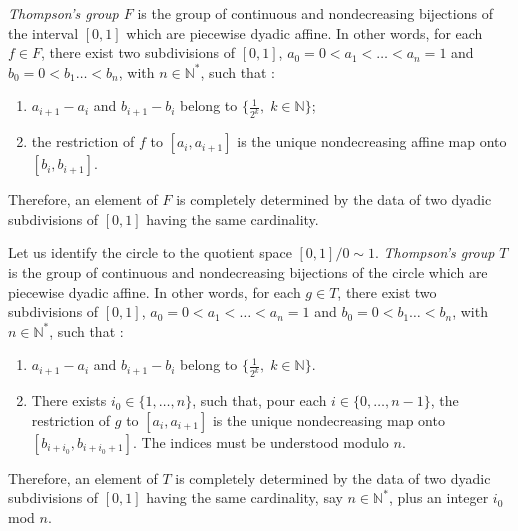 \documentclass[twoside]{irmaems}
\theoremstyle{plain}
\theoremstyle{definition}
\theoremstyle{remark}
\newcommand{\N}{{\mathbb{N}}}
\begin{document}
{\it Thompson's group  $F$}  
is the group of continuous and nondecreasing bijections of the interval $[0,1]$ which are piecewise dyadic affine. In other words, for each $f\in F$, there exist two subdivisions of $[0,1]$, $a_0=0<a_1<\ldots<a_n=1$ and $b_0=0<b_1\ldots<b_n$, with $n\in \N^*$, such that :
\begin{enumerate}
\item $a_{i+1}-a_i$ and $b_{i+1}-b_i$ belong to $\{\frac{1}{2^k},\; k\in \N\}$;
\item  the restriction of $f$ to $[a_i,a_{i+1}]$ is the unique nondecreasing affine map  onto  $[b_i, b_{i+1}]$.
\end{enumerate}

\vspace{0.1cm}\noindent 
Therefore, an element of $F$ is completely determined by the data of two dyadic subdivisions of  $[0,1]$ having the same cardinality.

\vspace{0.1cm}\noindent 
Let us identify the circle to the quotient space $[0,1]/0\sim 1$. {\it Thompson's group $T$}   is the group of continuous and nondecreasing bijections of the circle which are piecewise dyadic affine.
In other words, for each $g\in T$, there exist two  subdivisions of $[0,1]$, $a_0=0<a_1<\ldots<a_n=1$ and $b_0=0<b_1\ldots<b_n$, with  $n\in \N^*$, such that :
\begin{enumerate}
\item $a_{i+1}-a_i$ and $b_{i+1}-b_i$ belong to $\{\frac{1}{2^k},\; k\in \N\}$.  
\item There exists $i_0\in \{1,\ldots, n\}$, such that, pour each $i\in \{0,\ldots, n-1\}$, the restriction of $g$ to $[a_i,a_{i+1}]$ is the unique nondecreasing map onto $[b_{i+i_0}, b_{i+i_0+1}]$. The indices must be understood  modulo $n$.
\end{enumerate}

\vspace{0.1cm}\noindent 
Therefore, an element of $T$ is completely determined by the data of two dyadic subdivisions of $[0,1]$ having the same cardinality, 
say $n\in \N^*$, plus an integer  $i_{0}$ mod $n$.
\end{document}
